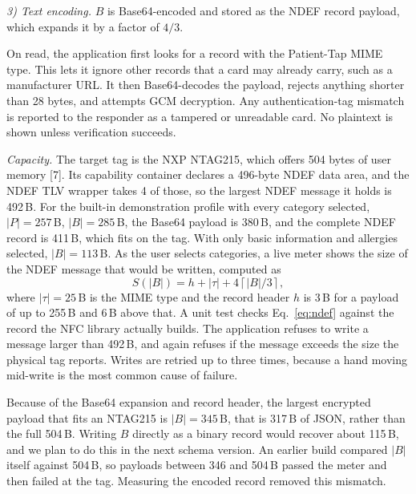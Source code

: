 \emph{3) Text encoding.} $B$ is Base64-encoded and stored as the NDEF record
payload, which expands it by a factor of $4/3$.

On read, the application first looks for a record with the Patient-Tap MIME
type. This lets it ignore other records that a card may already carry, such
as a manufacturer URL. It then Base64-decodes the payload, rejects anything
shorter than 28 bytes, and attempts GCM decryption. Any authentication-tag
mismatch is reported to the responder as a tampered or unreadable card. No
plaintext is shown unless verification succeeds.

\emph{Capacity.} The target tag is the NXP NTAG215, which offers 504 bytes of
user memory [7]. Its capability container declares a 496-byte NDEF data area,
and the NDEF TLV wrapper takes 4 of those, so the largest NDEF message it
holds is 492\,B. For the built-in demonstration profile with every category
selected, $|P| = 257$\,B, $|B| = 285$\,B, the Base64 payload is 380\,B, and
the complete NDEF record is 411\,B, which fits on the tag. With only basic
information and allergies selected, $|B| = 113$\,B. As the user selects
categories, a live meter shows the size of the NDEF message that would be
written, computed as
\begin{equation}
S(|B|) = h + |\tau| + 4\left\lceil |B|/3 \right\rceil,
\label{eq:ndef}
\end{equation}
where $|\tau| = 25$\,B is the MIME type and the record header $h$ is 3\,B
for a payload of up to 255\,B and 6\,B above that. A unit test checks
Eq.~\eqref{eq:ndef} against the record the NFC library actually builds. The
application refuses to write a message larger than 492\,B, and again refuses
if the message exceeds the size the physical tag reports. Writes are retried
up to three times, because a hand moving mid-write is the most common cause
of failure.

Because of the Base64 expansion and record header, the largest encrypted
payload that fits an NTAG215 is $|B| = 345$\,B, that is 317\,B of JSON,
rather than the full 504\,B. Writing $B$ directly as a binary record would
recover about 115\,B, and we plan to do this in the next schema version.
An earlier build compared $|B|$ itself against 504\,B, so payloads between
346 and 504\,B passed the meter and then failed at the tag. Measuring the
encoded record removed this mismatch.


